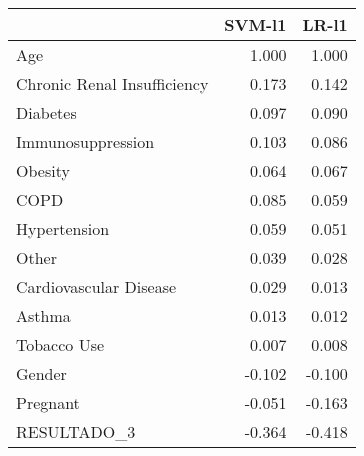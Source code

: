 \begin{tabular}{lrr}
\toprule
{} &  SVM-l1 &  LR-l1 \\
\midrule
Age                         &   1.000 &  1.000 \\
Chronic Renal Insufficiency &   0.173 &  0.142 \\
Diabetes                    &   0.097 &  0.090 \\
Immunosuppression           &   0.103 &  0.086 \\
Obesity                     &   0.064 &  0.067 \\
COPD                        &   0.085 &  0.059 \\
Hypertension                &   0.059 &  0.051 \\
Other                       &   0.039 &  0.028 \\
Cardiovascular Disease      &   0.029 &  0.013 \\
Asthma                      &   0.013 &  0.012 \\
Tobacco Use                 &   0.007 &  0.008 \\
Gender                      &  -0.102 & -0.100 \\
Pregnant                    &  -0.051 & -0.163 \\
RESULTADO\_3                 &  -0.364 & -0.418 \\
\bottomrule
\end{tabular}
